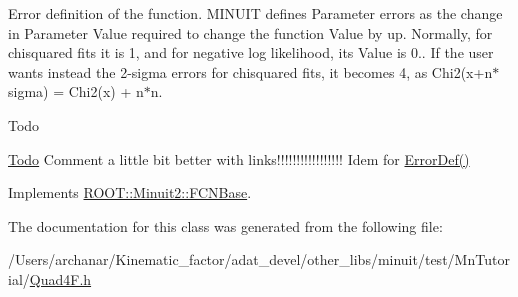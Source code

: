 Error definition of the function. M\+I\+N\+U\+IT defines Parameter errors as the change in Parameter Value required to change the function Value by up. Normally, for chisquared fits it is 1, and for negative log likelihood, its Value is 0.. If the user wants instead the 2-\/sigma errors for chisquared fits, it becomes 4, as Chi2(x+n$\ast$sigma) = Chi2(x) + n$\ast$n.

\begin{DoxyRefDesc}{Todo}
\item[\mbox{\hyperlink{todo__todo000001}{Todo}}]Comment a little bit better with links!!!!!!!!!!!!!!!!! Idem for \mbox{\hyperlink{classROOT_1_1Minuit2_1_1FCNBase_ac4592475c58a65b037ba97ab5f3cba10}{Error\+Def()}}\end{DoxyRefDesc}


Implements \mbox{\hyperlink{classROOT_1_1Minuit2_1_1FCNBase_a04ef08ddad92ce8d89d498efbe021c39}{R\+O\+O\+T\+::\+Minuit2\+::\+F\+C\+N\+Base}}.



The documentation for this class was generated from the following file\+:\begin{DoxyCompactItemize}
\item 
/\+Users/archanar/\+Kinematic\+\_\+factor/adat\+\_\+devel/other\+\_\+libs/minuit/test/\+Mn\+Tutorial/\mbox{\hyperlink{Quad4F_8h}{Quad4\+F.\+h}}\end{DoxyCompactItemize}
